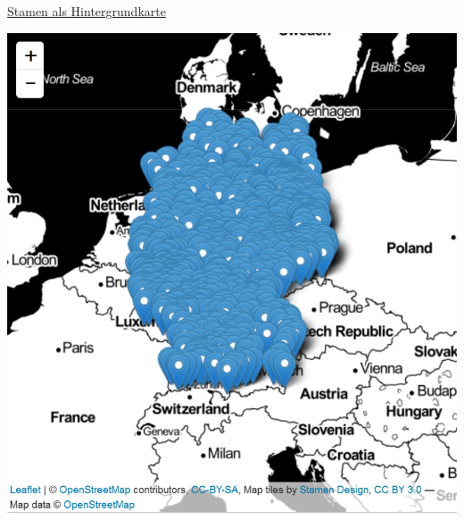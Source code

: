 \documentclass[ignorenonframetext,]{beamer}
\newenvironment{Shaded}{\begin{snugshade}}{\end{snugshade}}
\newcommand{\KeywordTok}[1]{\textcolor[rgb]{0.13,0.29,0.53}{\textbf{#1}}}
\newcommand{\StringTok}[1]{\textcolor[rgb]{0.31,0.60,0.02}{#1}}
\newcommand{\OperatorTok}[1]{\textcolor[rgb]{0.81,0.36,0.00}{\textbf{#1}}}
\newcommand{\NormalTok}[1]{#1}
\begin{document}
\begin{frame}[fragile]{\href{https://rstudio.github.io/leaflet/basemaps.html}{Stamen
als Hintergrundkarte}}

\begin{Shaded}
\end{Shaded}

\includegraphics{figure/InteractiveStamen.PNG}

\end{frame}
\end{document}
